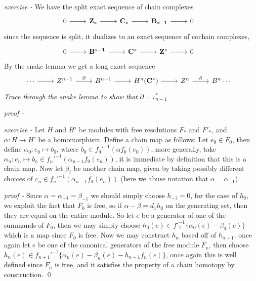 \documentclass[11pt]{article}
\theoremstyle{definition}
\newcommand{\set}[1]{\{#1\}}
\begin{document}
    \emph{exercise - }\label{CEx8} We have the split exact sequence of chain complexes
    \begin{equation*}
        \begin{tikzcd}
            0 \arrow[r,"{}"] & \mathbf{Z_*} \arrow[r,"{}"] & \mathbf{C_*} \arrow[r,"{}"] & \mathbf{B_{* - 1}} \arrow[r,"{}"] & 0
        \end{tikzcd}
    \end{equation*}
    since the sequence is split, it dualizes to an exact sequence of cochain complexes,
    \begin{equation*}
        \begin{tikzcd}
            0 \arrow[r,"{}"] & \mathbf{B^{* - 1}} \arrow[r,"{}"] & \mathbf{C^*} \arrow[r,"{}"] & \mathbf{Z^*} \arrow[r,"{}"] & 0
        \end{tikzcd}
    \end{equation*}
    By the snake lemma we get a long exact sequence
    \begin{equation*}
        \begin{tikzcd}
            \cdots \arrow[r,"{}"] & Z^{n-1} \arrow[r,"{\partial}"] & B^{n-1} \arrow[r,"{}"] & H^n(\mathbf{C^*}) \arrow[r,"{}"] & Z^n \arrow[r,"{\partial}"] & B^n\cdots
        \end{tikzcd}
    \end{equation*}
    \emph{Trace through the snake lemma to show that} \(\partial = \iota_{n-1}^*\)

    \emph{proof - }


    \emph{exercise - }\label{CEx9} Let \(H\) and \(H'\) be modules with free resolutions \(F_*\) and \(F'_*\), and \(\alpha: H \to H'\) be a homomorphism. Define a chain map as follows: Let \(e_0 \in F_0\), then define \(\alpha_0:e_0 \mapsto b_0\), where \(b_0 \in f_0'^{-1}(\alpha f_0(e_0))\), more generally, take \(\alpha_n: e_n \mapsto b_n \in f_n'^{-1}(\alpha_{n-1}f_0(e_n))\), it is immediate by definition that this is a chain map. Now let \(\beta_i\) be another chain map, given by taking possibly different choices of \(c_n \in f_n'^{-1}(\alpha_{n-1}f_0(e_n))\) (here we abuse notation that \(\alpha = \alpha_{-1}\)).

    \emph{proof - } Since \(\alpha = \alpha_{-1} = \beta_{-1}\) we should simply choose \(h_{-1} = 0\), for the case of \(h_0\), we exploit the fact that \(F_0\) is free, so if \(\alpha - \beta = d_1h_0\) on the generating set, then they are equal on the entire module. So let \(e\) be a generator of one of the summands of \(F_0\), then we may simply choose \(h_0(e) \in f'^{-1}_1\set{\alpha_0(e) - \beta_0(e)}\) which is a map since \(F_0\) is free. Now we may construct \(h_n\) based off of \(h_{n-1}\), once again let \(e\) be one of the canonical generators of the free module \(F_n\), then choose \(h_n(e) \in f_{n+1}'^{-1}\set{\alpha_n(e) - \beta_n(e) - h_{n-1}f_n(e)}\), once again this is well defined since \(F_n\) is free, and it satisfies the property of a chain homotopy by construction. \qed
\end{document}
